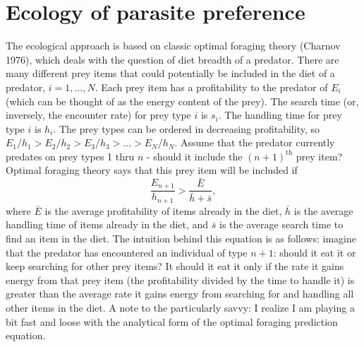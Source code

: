 \documentclass[11pt,reqno,final,pdftex]{amsart}\usepackage[]{graphicx}\usepackage[]{color}
\theoremstyle{plain}
\numberwithin{equation}{part}
\begin{document}
\section{Ecology of parasite preference}
The ecological approach is based on classic optimal foraging theory (Charnov 1976), which deals with the question of diet breadth of a predator.
There are many different prey items that could potentially be included in the diet of a predator, $i = 1, \dots, N$.
Each prey item has a profitability to the predator of $E_i$ (which can be thought of as the energy content of the prey).
The search time (or, inversely, the encounter rate) for prey type $i$ is $s_i$.
The handling time for prey type $i$ is $h_i$.
The prey types can be ordered in decreasing profitability, so $E_1/h_1 > E_2/h_2 > E_3/h_3 > \dots > E_N/h_N$.
Assume that the predator currently predates on prey types 1 thru $n$ - should it include the $(n+1)^{\text{th}}$ prey item?
Optimal foraging theory says that this prey item will be included if
\begin{equation}\label{eq:OFT}
\frac{E_{n+1}}{h_{n+1}} > \frac{\bar{E}}{\bar{h} + \bar{s}},
\end{equation}
where $\bar{E}$ is the average profitability of items already in the diet, $\bar{h}$ is the average handling time of items already in the diet, and $\bar{s}$ is the average search time to find an item in the diet.
The intuition behind this equation is as follows: imagine that the predator has encountered an individual of type $n+1$: should it eat it or keep searching for other prey items?
It should it eat it only if the rate it gains energy from that prey item (the profitability divided by the time to handle it) is greater than the average rate it gains energy from searching for and handling all other items in the diet.
A note to the particularly savvy: I realize I am playing a bit fast and loose with the analytical form of the optimal foraging prediction equation.
\begin{comment}
What I am showing is essentially the optimal foraging theory prediction if a predator
The form of the equation I have shown is essentially the per-prey-item prediction.
However, because optimal foraging theory deals with predators, a single predator will potentially encounter many prey in a given period of time, so technically the prediction should include information about how many prey of each type will be encountered.
A parasite, however, needs only to encounter a single host (which it will infect, or not), so the per-prey-item form makes sense.
\end{comment}
\end{document}
